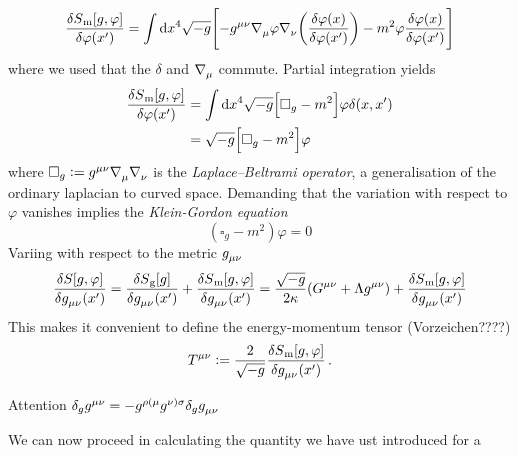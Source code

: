 \begin{equation}
\frac{\delta S\textsubscript{m}[g,\varphi]}{\delta \varphi\left(x'\right)}=\int
\dif x^4\sqrt{-g}\left[-\tensor{g}{^\mu^\nu}
\tensor{\nabla}{_\mu}\varphi\tensor{\nabla}{_\nu}\left(\frac{\delta
\varphi(x)}{\delta \varphi\left(x'\right)}\right)-m^2\varphi\frac{\delta
\varphi(x)}{\delta \varphi\left(x'\right)}\right]
\end{equation}
where we used that the $\delta$ and $\tensor{\nabla}{_\mu}$ commute. Partial
integration yields 
\begin{equation}
\begin{split}
\frac{\delta S\textsubscript{m}[g,\varphi]}{\delta \varphi\left(x'\right)}&=\int
\dif
x^4\sqrt{-g}\left[\square_{g}-m^2\right]\varphi\delta(x,x')\\
&=\sqrt{-g}\left[\square_{g}-m^2\right]\varphi
\end{split}
\end{equation}
where $\square_{g}:=\tensor{g}{^\mu^\nu}
\tensor{\nabla}{_\mu}\tensor{\nabla}{_\nu} $ is the
\emph{Laplace–Beltrami operator}, a generalisation of the ordinary laplacian to
curved space.
Demanding that the variation with respect to $\varphi$ vanishes implies the
\emph{Klein-Gordon equation}
\begin{equation}
\left(\square_g-m^2\right)\varphi=0
\end{equation}
Variing with respect to the metric $\tensor{g}{_\mu_\nu}$
\begin{equation}
\frac{\delta S[g,\varphi]}{\delta
\tensor{g}{_\mu_\nu}\left(x'\right)}=
\frac{\delta S\textsubscript{g}[g]}{\delta
\tensor{g}{_\mu_\nu}\left(x'\right)}
+\frac{\delta S\textsubscript{m}[g,\varphi]}{\delta
\tensor{g}{_\mu_\nu}\left(x'\right)}
=\frac{\sqrt{-g}}{2\kappa}\left(\tensor{G}{^\mu^\nu}+\Lambda\tensor{g}{^\mu^\nu}
\right)+\frac{\delta S\textsubscript{m}[g,\varphi]}{\delta
\tensor{g}{_\mu_\nu}\left(x'\right)}
\end{equation}
This makes it convenient to define the energy-momentum tensor (Vorzeichen????)
\begin{equation}
\tensor{T}{^\mu^\nu}:=\frac{2}{\sqrt{-g}}\frac{\delta
S\textsubscript{m}[g,\varphi]}{\delta \tensor{g}{_\mu_\nu}\left(x'\right)}\,.
\end{equation}
\begin{remark}
Attention $\delta_g
\tensor{g}{^\mu^\nu}=-\tensor{g}{^\rho^{(\mu}}\tensor{g}{^{\nu)}^\sigma}\delta_g
\tensor{g}{_\mu_\nu}$
\end{remark}
We can now proceed in calculating the quantity we have ust introduced for a

